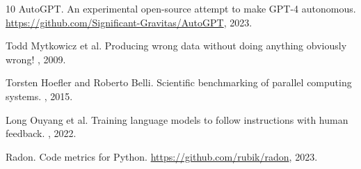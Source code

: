 \documentclass[sigconf,nonacm]{acmart}
\begin{document}
\begin{thebibliography}{10}
AutoGPT.
\newblock An experimental open-source attempt to make GPT-4 autonomous.
\newblock \url{https://github.com/Significant-Gravitas/AutoGPT}, 2023.

Todd Mytkowicz et al.
\newblock Producing wrong data without doing anything obviously wrong!
, 2009.

Torsten Hoefler and Roberto Belli.
\newblock Scientific benchmarking of parallel computing systems.
, 2015.

Long Ouyang et al.
\newblock Training language models to follow instructions with human feedback.
, 2022.

Radon.
\newblock Code metrics for Python.
\newblock \url{https://github.com/rubik/radon}, 2023.

\end{thebibliography}
\end{document}
